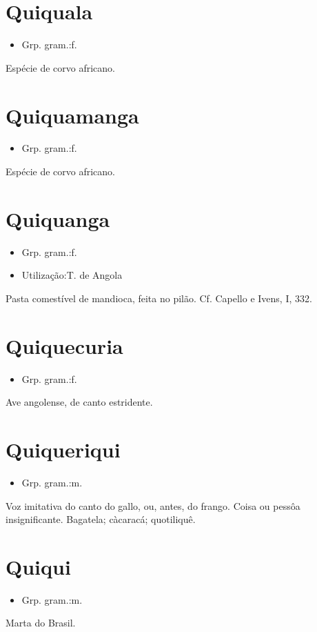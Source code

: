 \section{Quiquala}
\begin{itemize}
\item {Grp. gram.:f.}
\end{itemize}
Espécie de corvo africano.
\section{Quiquamanga}
\begin{itemize}
\item {Grp. gram.:f.}
\end{itemize}
Espécie de corvo africano.
\section{Quiquanga}
\begin{itemize}
\item {Grp. gram.:f.}
\end{itemize}
\begin{itemize}
\item {Utilização:T. de Angola}
\end{itemize}
Pasta comestível de mandioca, feita no pilão. Cf. Capello e Ivens, I, 332.
\section{Quiquecuria}
\begin{itemize}
\item {Grp. gram.:f.}
\end{itemize}
Ave angolense, de canto estridente.
\section{Quiqueriqui}
\begin{itemize}
\item {Grp. gram.:m.}
\end{itemize}
Voz imitativa do canto do gallo, \textunderscore ou\textunderscore , antes, do frango.
Coisa ou pessôa insignificante.
Bagatela; càcaracá; quotiliquê.
\section{Quiqui}
\begin{itemize}
\item {Grp. gram.:m.}
\end{itemize}
Marta do Brasil.
